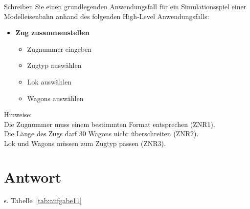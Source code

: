 Schreiben Sie einen grundlegenden Anwendungsfall für ein Simulationsspiel einer
Modelleisenbahn anhand des folgenden High‐Level Anwendungsfalls:

\begin{itemize}
    \item \textbf{Zug zusammenstellen}
    \begin{itemize}
        \item Zugnummer eingeben
        \item Zugtyp auswählen
        \item Lok auswählen
        \item Wagons auswählen
    \end{itemize}
\end{itemize}

\noindent
Hinweise:\\
Die Zugnummer muss einem bestimmten Format entsprechen (ZNR1).\\
Die Länge des Zugs darf 30 Wagons nicht überschreiten (ZNR2).\\
Lok und Wagons müssen zum Zugtyp passen (ZNR3).

\section*{Antwort}

s. Tabelle~\ref{tab:aufgabe11}

